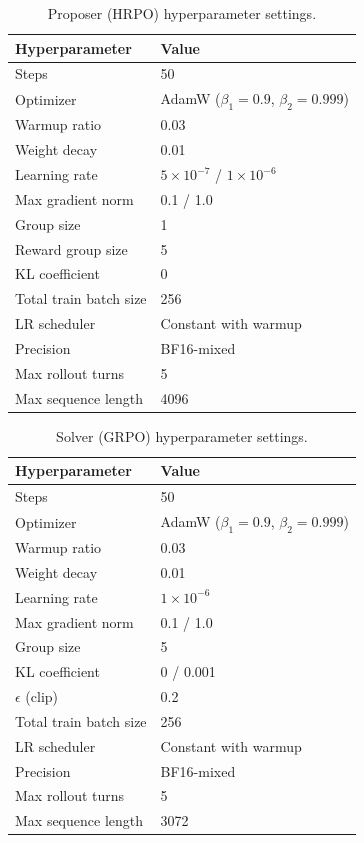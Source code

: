 \documentclass{article}
\begin{document}
\begin{table}[h]
\centering
\caption{Proposer (HRPO) hyperparameter settings.}
\label{tab:hrpo_hp}
\small
\begin{tabular}{ll}
\toprule
\textbf{Hyperparameter} & \textbf{Value} \\
\midrule
Steps & 50 \\
Optimizer & AdamW ($\beta_1{=}0.9$, $\beta_2{=}0.999$) \\
Warmup ratio & 0.03 \\
Weight decay & 0.01 \\
Learning rate & $5\times10^{-7}$ / $1\times10^{-6}$ \\
Max gradient norm & 0.1 / 1.0 \\
Group size & 1 \\
Reward group size & 5 \\
KL coefficient & 0 \\
Total train batch size & 256 \\
LR scheduler & Constant with warmup \\
Precision & BF16-mixed \\
Max rollout turns & 5 \\
Max sequence length & 4096 \\
\bottomrule
\end{tabular}
\end{table}

\begin{table}[h]
\centering
\caption{Solver (GRPO) hyperparameter settings.}
\label{tab:grpo_hp}
\small
\begin{tabular}{ll}
\toprule
\textbf{Hyperparameter} & \textbf{Value} \\
\midrule
Steps & 50 \\
Optimizer & AdamW ($\beta_1{=}0.9$, $\beta_2{=}0.999$) \\
Warmup ratio & 0.03 \\
Weight decay & 0.01 \\
Learning rate & $1\times10^{-6}$ \\
Max gradient norm & 0.1 / 1.0 \\
Group size & 5 \\
KL coefficient & 0 / 0.001 \\
$\epsilon$ (clip) & 0.2 \\
Total train batch size & 256 \\
LR scheduler & Constant with warmup \\
Precision & BF16-mixed \\
Max rollout turns & 5 \\
Max sequence length & 3072 \\
\bottomrule
\end{tabular}
\end{table}
\end{document}
